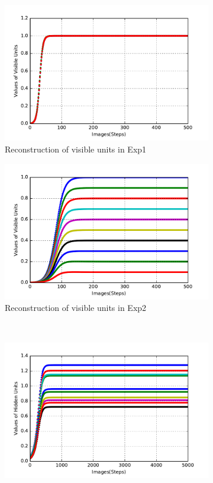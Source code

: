 \begin{figure}
\begin{subfigure}[t]{0.4\textwidth}
			\includegraphics[width=\textwidth]{pics_sdlm/20_exp_AE/exp1_recon_non.pdf}
			\caption{Reconstruction of visible units in Exp1}
		\end{subfigure}
		\begin{subfigure}[t]{0.4\textwidth}
			\includegraphics[width=\textwidth]{pics_sdlm/20_exp_AE/exp2_recon_non.pdf}
			\caption{Reconstruction of visible units in Exp2}
		\end{subfigure}\\
		\begin{subfigure}[t]{0.4\textwidth}
			\includegraphics[width=\textwidth]{pics_sdlm/20_exp_AE/exp1_hid_non.pdf}

\end{subfigure}
\end{figure}
